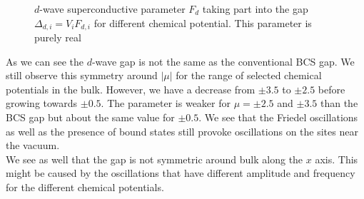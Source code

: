 \documentclass[..\main.tex]{subfile}
\begin{document}
\begin{figure}[H]
    
    \caption{$d$-wave superconductive parameter $F_d$ taking part into the gap $\Delta_{d,i} = V_i F_{d,i}$ for different chemical potential. This parameter is purely 
    real}
\end{figure}
As we can see the $d$-wave gap is not the same as the conventional BCS gap. We still observe this symmetry around $|\mu|$ for the range of selected chemical potentials in the bulk.
However, we have a decrease from $\pm3.5$ to $\pm2.5$ before growing towards $\pm0.5$. The parameter is weaker for $\mu=\pm2.5$ and $\pm3.5$ than the BCS gap but
about the same value for $\pm0.5$. We see that the Friedel oscillations as well as the presence of bound states still provoke oscillations on the sites near the vacuum.\\
We see as well that the gap is not symmetric around bulk along the $x$ axis. This might be caused by the oscillations that have different amplitude and frequency
for the different chemical potentials.\\



\end{document}
